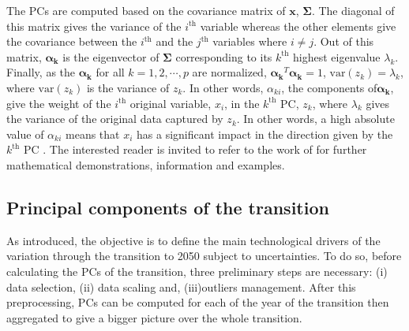 The PCs are computed based on the covariance matrix of $\mathbf{x}$, $\mathbf{\Sigma}$. The diagonal of this matrix gives the variance of the $i^{\text{th}}$ variable whereas the other elements give the covariance between the $i^{\text{th}}$ and the $j^{\text{th}}$ variables where $i\neq j$. Out of this matrix, $\mathbf{\alpha_k}$ is the eigenvector of $\mathbf{\Sigma}$ corresponding to its $k^{\text{th}}$ highest eigenvalue $\lambda_k$. Finally, as the $\mathbf{\alpha_k}$ for all $k=1,2,\cdots, p$ are normalized,  \ie $\mathbf{\alpha_k}^{T}\mathbf{\alpha_k}=1$, $\mathrm{var}\left(z_k\right)=\lambda_k$, where $\mathrm{var}\left(z_k\right)$ is the variance of $z_k$. In other words, $\alpha_{ki}$, \ie the components of$ \mathbf{\alpha_k}$, give the weight of the $i^{\text{th}}$ original variable, $x_i$, in the $k^{\text{th}}$ PC, \ie $z_k$, where $\lambda_k$ gives the variance of the original data captured by $z_k$. In other words, a high absolute value of $\alpha_{ki}$ means that $x_i$ has a significant impact in the direction given by the $k^{\text{th}}$ PC \cite{zdybal2022advancing}. The interested reader is invited to refer to the work of \citet{jolliffe2002principal} for further mathematical demonstrations, information and examples.

\subsection{Principal components of the transition}
\label{subsec:meth:PCA:transition}
As introduced, the objective is to define the main technological drivers of the variation through the transition to 2050 subject to uncertainties. To do so, before calculating the PCs of the transition, three preliminary steps are necessary: (i) data selection, (ii) data scaling and, (iii)outliers management. After this preprocessing, PCs can be computed for each of the year of the transition then aggregated to give a bigger picture over the whole transition.\\

\\

